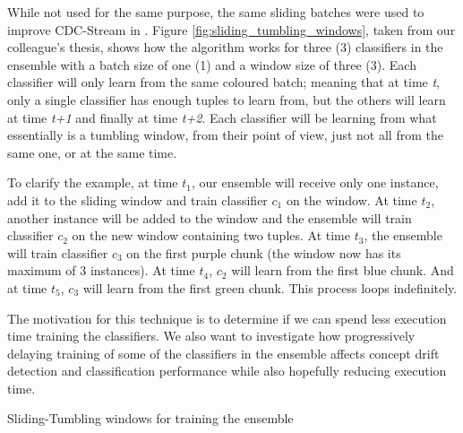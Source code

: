 While not used for the same purpose, the same sliding batches were used to improve CDC-Stream in \citep{d2016fine}. Figure \ref{fig:sliding_tumbling_windows}, taken from our colleague's thesis, shows how the algorithm works for three (3) classifiers in the ensemble with a batch size of one (1) and a window size of three (3). Each classifier will only learn from the same coloured batch; meaning that at time \textit{t}, only a single classifier has enough tuples to learn from, but the others will learn at time \textit{t+1} and finally at time \textit{t+2}. Each classifier will be learning from what essentially is a tumbling window, from their point of view, just not all from the same one, or at the same time. 

To clarify the example, at time $t_1$, our ensemble will receive only one instance, add it to the sliding window and train classifier $c_1$ on the window. At time $t_2$, another instance will be added to the window and the ensemble will train classifier $c_2$ on the new window containing two tuples. At time $t_3$, the ensemble will train classifier $c_3$ on the first purple chunk (the window now has its maximum of 3 instances). At time $t_4$, $c_2$ will learn from the first blue chunk. And at time $t_5$, $c_3$ will learn from the first green chunk. This process loops indefinitely. 

The motivation for this technique is to determine if we can spend less execution time training the classifiers. We also want to investigate how progressively delaying training of some of the classifiers in the ensemble affects concept drift detection and classification performance while also hopefully reducing execution time.

\begin{algorithm}
\caption{Sliding-Tumbling windows for training the ensemble\label{alg:sliding_tumbling_windows}}
\end{algorithm}


